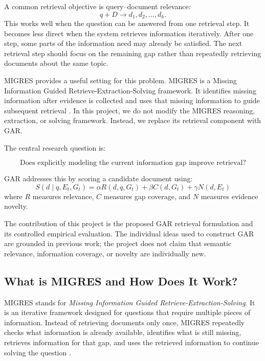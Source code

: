 \documentclass[11pt,a4paper]{article}
\begin{document}
A common retrieval objective is query--document relevance:
\[
q+D \longrightarrow d_1,d_2,\ldots,d_k.
\]
This works well when the question can be answered from one retrieval step. It becomes less direct when the system retrieves information iteratively. After one step, some parts of the information need may already be satisfied. The next retrieval step should focus on the remaining gap rather than repeatedly retrieving documents about the same topic.

MIGRES provides a useful setting for this problem. MIGRES is a Missing Information Guided Retrieve-Extraction-Solving framework. It identifies missing information after evidence is collected and uses that missing information to guide subsequent retrieval \citep{wang-etal-2025-llms}. In this project, we do not modify the MIGRES reasoning, extraction, or solving framework. Instead, we replace its retrieval component with GAR.

The central research question is:

\[
\boxed{\text{Does explicitly modeling the current information gap improve retrieval?}}
\]

GAR addresses this by scoring a candidate document using:
\[
\boxed{
S(d\mid q,E_t,G_t)
=
\alpha R(d,q,G_t)
+
\beta C(d,G_t)
+
\gamma N(d,E_t)
}
\]
where $R$ measures relevance, $C$ measures gap coverage, and $N$ measures evidence novelty.

The contribution of this project is the proposed GAR retrieval formulation and its controlled empirical evaluation. The individual ideas used to construct GAR are grounded in previous work; the project does not claim that semantic relevance, information coverage, or novelty are individually new.

\subsection{What is MIGRES and How Does It Work?}

MIGRES stands for \textit{Missing Information Guided Retrieve-Extraction-Solving}. It is an iterative framework designed for questions that require multiple pieces of information. Instead of retrieving documents only once, MIGRES repeatedly checks what information is already available, identifies what is still missing, retrieves information for that gap, and uses the retrieved information to continue solving the question \citep{wang-etal-2025-llms}.
\end{document}
